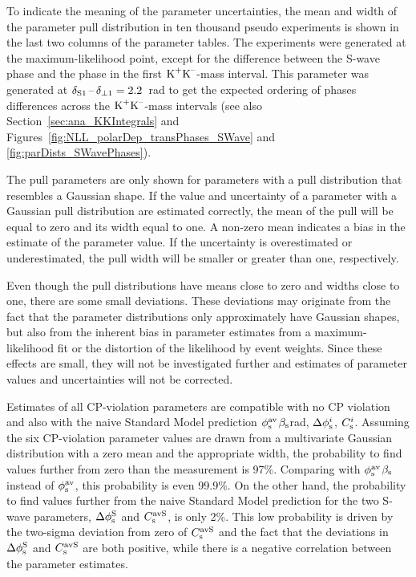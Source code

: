 To indicate the meaning of the parameter uncertainties, the mean and width of the parameter pull distribution in ten thousand pseudo
experiments is shown in the last two columns of the parameter tables. The experiments were generated at the maximum-likelihood point,
except for the difference between the S-wave phase and the \BstoJpsiphi{} phase in the first $\KK$-mass interval. This parameter was
generated at $\delSperp[\text{1}]=2.2$~rad to get the expected ordering of phases differences across the $\KK$-mass intervals (see also
Section~\ref{sec:ana_KKIntegrals} and Figures~\ref{fig:NLL_polarDep_transPhases_SWave} and \ref{fig:parDists_SWavePhases}).

The pull parameters are only shown for parameters with a pull distribution that resembles a Gaussian shape. If the value and uncertainty of
a parameter with a Gaussian pull distribution are estimated correctly, the mean of the pull will be equal to zero and its width equal to
one. A non-zero mean indicates a bias in the estimate of the parameter value. If the uncertainty is overestimated or underestimated, the
pull width will be smaller or greater than one, respectively.

Even though the pull distributions have means close to zero and widths close to one, there are some small deviations. These deviations may
originate from the fact that the parameter distributions only approximately have Gaussian shapes, but also from the inherent bias in
parameter estimates from a maximum-likelihood fit or the distortion of the likelihood by event weights. Since these effects are small, they
will not be investigated further and estimates of parameter values and uncertainties will not be corrected.

Estimates of all CP-violation parameters are compatible with no CP violation and also with the naive Standard Model prediction
$\phisav$\texteq{}$\bs$\mbox{\textapprox{}\unitsp{}rad}, $\Delphisi$, $\Csi$. Assuming the six \BstoJpsiphi{}
CP-violation parameter values are drawn from a multivariate Gaussian distribution with a zero mean and the appropriate width, the
probability to find values further from zero than the measurement is 97\%. Comparing with $\phisav$\texteq{}$\bs$ instead of
$\phisav$, this probability is even 99.9\%. On the other hand, the probability to find values further from the naive Standard Model
prediction for the two S-wave parameters, $\DelphisS$ and $\CsavS$, is only 2\%. This low probability is driven by the two-sigma deviation
from zero of $\CsavS$ and the fact that the deviations in $\DelphisS$ and $\CsavS$ are both positive, while there is a negative correlation
between the parameter estimates.

